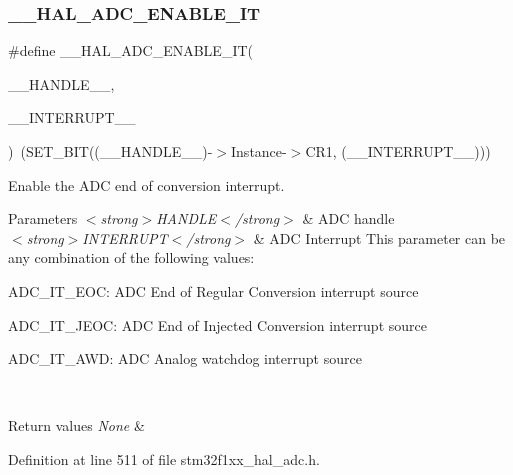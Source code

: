 \subsubsection{\texorpdfstring{\+\_\+\+\_\+\+H\+A\+L\+\_\+\+A\+D\+C\+\_\+\+E\+N\+A\+B\+L\+E\+\_\+\+IT}{\_\_HAL\_ADC\_ENABLE\_IT}}
{\footnotesize\ttfamily \#define \+\_\+\+\_\+\+H\+A\+L\+\_\+\+A\+D\+C\+\_\+\+E\+N\+A\+B\+L\+E\+\_\+\+IT(\begin{DoxyParamCaption}\item[{}]{\+\_\+\+\_\+\+H\+A\+N\+D\+L\+E\+\_\+\+\_\+,  }\item[{}]{\+\_\+\+\_\+\+I\+N\+T\+E\+R\+R\+U\+P\+T\+\_\+\+\_\+ }\end{DoxyParamCaption})~(S\+E\+T\+\_\+\+B\+IT((\+\_\+\+\_\+\+H\+A\+N\+D\+L\+E\+\_\+\+\_\+)-\/$>$Instance-\/$>$C\+R1, (\+\_\+\+\_\+\+I\+N\+T\+E\+R\+R\+U\+P\+T\+\_\+\+\_\+)))}



Enable the A\+DC end of conversion interrupt. 


\begin{DoxyParams}{Parameters}
{\em $<$strong$>$\+H\+A\+N\+D\+L\+E$<$/strong$>$} & A\+DC handle \\
\hline
{\em $<$strong$>$\+I\+N\+T\+E\+R\+R\+U\+P\+T$<$/strong$>$} & A\+DC Interrupt This parameter can be any combination of the following values\+: \begin{DoxyItemize}
\item A\+D\+C\+\_\+\+I\+T\+\_\+\+E\+OC\+: A\+DC End of Regular Conversion interrupt source \item A\+D\+C\+\_\+\+I\+T\+\_\+\+J\+E\+OC\+: A\+DC End of Injected Conversion interrupt source \item A\+D\+C\+\_\+\+I\+T\+\_\+\+A\+WD\+: A\+DC Analog watchdog interrupt source \end{DoxyItemize}
\\
\hline
\end{DoxyParams}

\begin{DoxyRetVals}{Return values}
{\em None} & \\
\hline
\end{DoxyRetVals}


Definition at line 511 of file stm32f1xx\+\_\+hal\+\_\+adc.\+h.

\mbox{\label{group___a_d_c___exported___macros_gaff951862689bb92173f803577cf2d447}} 
